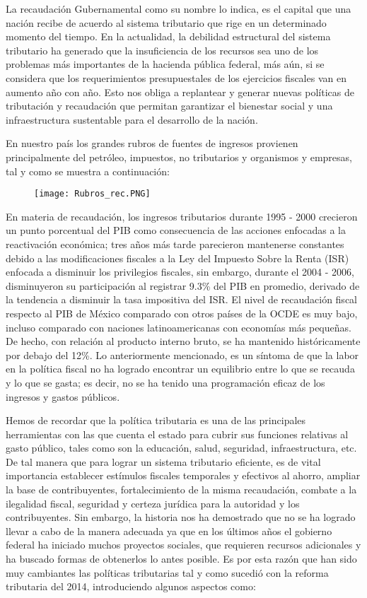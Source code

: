 La recaudación Gubernamental como su nombre lo indica, es el capital que una nación recibe de acuerdo al sistema tributario que rige en un determinado momento del tiempo. En la actualidad, la debilidad estructural del sistema tributario ha generado que la insuficiencia de los recursos sea uno de los problemas más importantes de la hacienda pública federal, más aún, si se considera que los requerimientos presupuestales de los ejercicios fiscales van en aumento año con año. Esto nos obliga a replantear y generar nuevas políticas de tributación y recaudación que permitan garantizar el bienestar social y una infraestructura sustentable para el desarrollo de la nación.\bigskip

En nuestro país los grandes rubros de fuentes de ingresos provienen principalmente del petróleo, impuestos, no tributarios y organismos y empresas, tal y como se muestra a continuación:

\begin{figure}[ht]
\texttt{[image: Rubros\_rec.PNG]}
\end{figure}

En materia de recaudación, los ingresos tributarios durante 1995 - 2000 crecieron un punto porcentual del PIB como consecuencia de las acciones enfocadas a la reactivación económica; tres años más tarde parecieron mantenerse constantes debido a las modificaciones fiscales a la Ley del Impuesto Sobre la Renta (ISR) enfocada a disminuir los privilegios fiscales, sin embargo, durante el 2004 - 2006, disminuyeron su participación al registrar 9.3\% del PIB en promedio, derivado de la tendencia a disminuir la tasa impositiva del ISR. El nivel de recaudación fiscal respecto al PIB de México comparado con otros países de la OCDE es muy bajo, incluso comparado con naciones latinoamericanas con economías más pequeñas. De hecho, con relación al producto interno bruto, se ha mantenido históricamente por debajo del 12\%. Lo anteriormente mencionado, es un síntoma de que la labor en la política fiscal no ha logrado encontrar un equilibrio entre lo que se recauda y lo que se gasta; es decir, no se ha tenido una programación eficaz de los ingresos y gastos públicos.\bigskip 


Hemos de recordar que la política tributaria es una de las principales herramientas con las que cuenta el estado para cubrir sus funciones relativas al gasto público, tales como son la educación, salud, seguridad, infraestructura, etc. De tal manera que para lograr un sistema tributario eficiente, es de vital importancia establecer estímulos fiscales temporales y efectivos al ahorro, ampliar la base de contribuyentes, fortalecimiento de la misma recaudación, combate a la ilegalidad fiscal, seguridad y certeza jurídica para la autoridad y los contribuyentes. Sin embargo, la historia nos ha demostrado que no se ha logrado llevar a cabo de la manera adecuada ya que en los últimos años el gobierno federal ha iniciado muchos proyectos sociales, que requieren recursos adicionales y ha buscado formas de obtenerlos lo antes posible. Es por esta razón que han sido muy cambiantes las políticas tributarias tal y como sucedió con la reforma tributaria del 2014, introduciendo algunos aspectos como:

